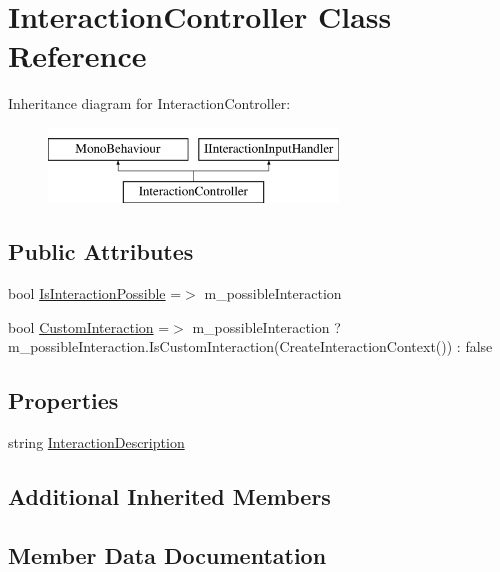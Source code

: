 \hypertarget{class_interaction_controller}{}\section{Interaction\+Controller Class Reference}
\label{class_interaction_controller}
Inheritance diagram for Interaction\+Controller\+:\begin{figure}[H]
\begin{center}
\leavevmode
\includegraphics[height=2.000000cm]{class_interaction_controller}
\end{center}
\end{figure}
\subsection*{Public Attributes}
\begin{DoxyCompactItemize}
\item 
bool \mbox{\hyperlink{class_interaction_controller_ae86bf01b15568b290931636a77726dcf}{Is\+Interaction\+Possible}} =$>$ m\+\_\+possible\+Interaction
\item 
bool \mbox{\hyperlink{class_interaction_controller_a0f75a5655cee682cec612d7b6af4099f}{Custom\+Interaction}} =$>$ m\+\_\+possible\+Interaction ? m\+\_\+possible\+Interaction.\+Is\+Custom\+Interaction(Create\+Interaction\+Context()) \+: false
\end{DoxyCompactItemize}
\subsection*{Properties}
\begin{DoxyCompactItemize}
\item 
string \mbox{\hyperlink{class_interaction_controller_af63fcbb75235b5e457b44d2e819a6cbd}{Interaction\+Description}}
\end{DoxyCompactItemize}
\subsection*{Additional Inherited Members}


\subsection{Member Data Documentation}
\mbox{\label{class_interaction_controller_a0f75a5655cee682cec612d7b6af4099f}} 
